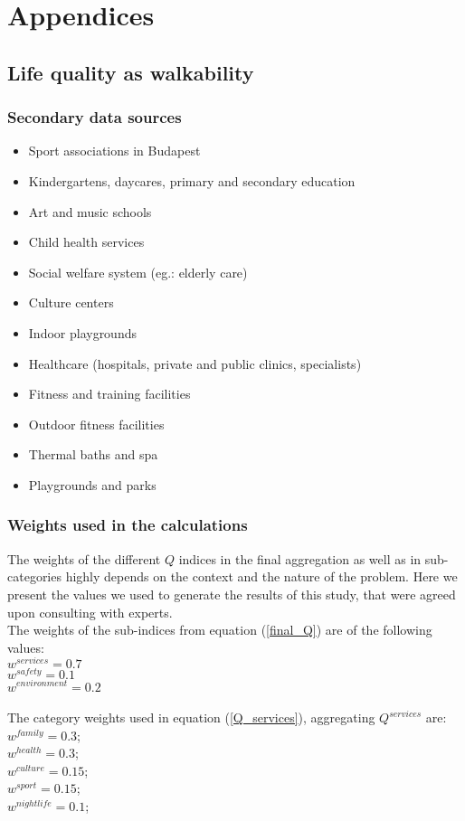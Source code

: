 \chapter{Appendices}

\section{Life quality as walkability}

\subsection{Secondary data sources}
\label{SI:walkabilityData}
\begin{itemize}
  \item {Sport associations in Budapest}~\cite{HU_sport}
  \item {Kindergartens, daycares, primary and secondary education}~\cite{HU_Edu}
  \item {Art and music schools}~\cite{HU_Art}
  \item {Child health services}~\cite{HU_Child}
  \item {Social welfare system (eg.: elderly care)}~\cite{HU_Social}
  \item{Culture centers}~\cite{HU_Cult}
  \item {Indoor playgrounds}~\cite{HU_Play}
  \item{Healthcare (hospitals, private and public clinics, specialists)}~\cite{HU_Health}
  \item{Fitness and training facilities}~\cite{HU_Fitness}
  \item{Outdoor fitness facilities}~\cite{HU_outfitness}
  \item{Thermal baths and spa}~\cite{HU_Thermal}
  \item{Playgrounds and parks}~\cite{HU_Park}
\end{itemize}

\subsection{Weights used in the calculations}
The weights of the different $Q$ indices in the final aggregation as well as in sub-categories highly depends on the context and the nature of the problem. Here we present the values we used to generate the results of this study, that were agreed upon consulting with experts.\\
The weights of the sub-indices from equation (\ref{final_Q}) are of the following values:\\
$w^{services}=0.7$\\
$w^{safety}=0.1$\\
$w^{environment}=0.2$\\ \\
The category weights used in equation (\ref{Q_services}), aggregating $Q^{services}$ are:\\
$w^{family}= 0.3$;\\
$w^{health}= 0.3$;\\
$w^{culture} = 0.15$;\\
$w^{sport} = 0.15$;\\
$w^{night life}=0.1$;\\